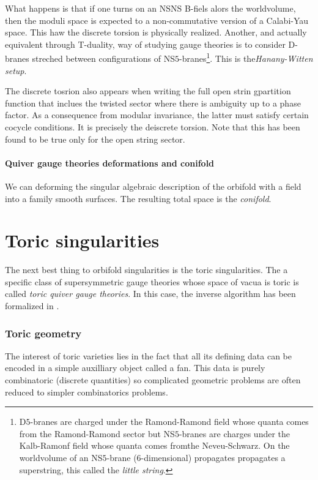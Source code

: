         What happens is that if one turns on an NSNS B-fiels alors the worldvolume, then the moduli space is expected to a non-commutative version of a Calabi-Yau space. This haw the discrete torsion is physically realized. Another, and actually equivalent through T-duality, way of studying gauge theories is to consider D-branes streched between configurations of NS$5$-branes\footnote{D$5$-branes are charged under the Ramond-Ramond field whose quanta comes from the Ramond-Ramond sector but NS$5$-branes are charges under the Kalb-Ramonf field whose quanta comes fromthe Neveu-Schwarz. On the worldvolume of an NS$5$-brane (6-dimensional) propagates propagates a superstring, this called the \emph{little string}.}. This is the\emph{Hanany-Witten setup}.

        The discrete tosrion also appears when writing the full open strin gpartition function that inclues the twisted sector where there is ambiguity up to a phase factor. As a consequence from modular invariance, the latter must satisfy certain cocycle conditions. It is precisely the deiscrete torsion. Note that this has been found to be true only for the open string sector.

    \subsection{Quiver gauge theories deformations and conifold}

        We can deforming the singular algebraic description of the orbifold with a field into a family smooth surfaces. The resulting total space is the \emph{conifold}.

\part{Toric singularities}

    The next best thing to orbifold singularities is the toric singularities.  The a specific class of supersymmetric gauge theories whose space of vacua is toric is called \emph{toric quiver gauge theories}. In this case, the inverse algorithm has been formalized in \cite{Feng_2001}.

\section{Toric geometry}

    The interest of toric varieties lies in the fact that all its defining data can be encoded in a simple auxilliary object called a fan. This data is purely combinatoric (discrete quantities) so complicated geometric problems are often reduced to simpler combinatorics problems.

